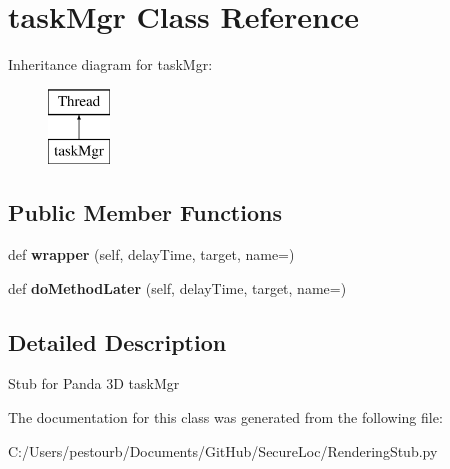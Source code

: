 \hypertarget{class_rendering_stub_1_1task_mgr}{}\section{task\+Mgr Class Reference}
\label{class_rendering_stub_1_1task_mgr}
Inheritance diagram for task\+Mgr\+:\begin{figure}[H]
\begin{center}
\leavevmode
\includegraphics[height=2.000000cm]{class_rendering_stub_1_1task_mgr}
\end{center}
\end{figure}
\subsection*{Public Member Functions}
\begin{DoxyCompactItemize}
\item 
\mbox{\label{class_rendering_stub_1_1task_mgr_acfc76021417da2e98b81ae907c817fa9}} 
def {\bfseries wrapper} (self, delay\+Time, target, name=\textquotesingle{}\textquotesingle{})
\item 
\mbox{\label{class_rendering_stub_1_1task_mgr_a07fe9d7157eded83f29c5caa0e5f9148}} 
def {\bfseries do\+Method\+Later} (self, delay\+Time, target, name=\textquotesingle{}\textquotesingle{})
\end{DoxyCompactItemize}


\subsection{Detailed Description}
\begin{DoxyVerb}Stub for Panda 3D taskMgr\end{DoxyVerb}
 

The documentation for this class was generated from the following file\+:\begin{DoxyCompactItemize}
\item 
C\+:/\+Users/pestourb/\+Documents/\+Git\+Hub/\+Secure\+Loc/Rendering\+Stub.\+py\end{DoxyCompactItemize}
